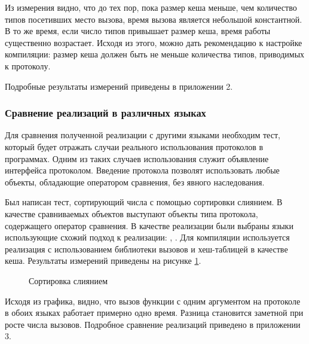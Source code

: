 Из измерения видно, что до тех пор, пока размер кеша меньше, чем количество типов посетивших место вызова, время вызова является небольшой константной. В то же время, если число типов привышает размер кеша, время работы существенно возрастает. Исходя из этого, можно дать рекомендацию к настройке компиляции: размер кеша должен быть не меньше количества типов, приводимых к протоколу.

Подробные результаты измерений приведены в приложении 2.

\subsubsection{Сравнение реализаций в различных языках}
Для сравнения полученной реализации с другими языками необходим тест, который будет отражать случаи реального использования протоколов в программах. Одним из таких случаев использования служит объявление интерфейса  протоколом. Введение протокола  позволят использовать любые объекты, обладающие оператором сравнения, без явного наследования.

Был написан тест, сортирующий числа с помощью сортировки слиянием\cite{9780262033848}. В качестве сравниваемых объектов выступают объекты типа протокола, содержащего оператор сравнения. В качестве реализации были выбраны  языки использующие схожий подход к реализации: , . Для компиляции  используется реализация с использованием библиотеки вызовов и хеш-таблицей в качестве кеша. Результаты измерений приведены на рисунке \ref{plot:bench:mergeSort}.

\begin{figure}[H]
\caption{\label{plot:bench:mergeSort} Сортировка слиянием}
\end{figure}

Исходя из графика, видно, что вызов функции с одним аргументом на протоколе в обоих языках работает примерно одно время. Разница становится заметной при росте числа вызовов. Подробное сравнение реализаций приведено в приложении 3.
